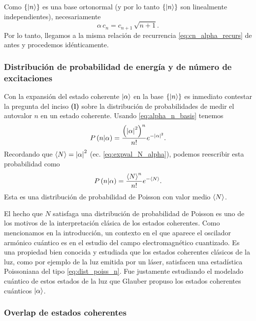 \documentclass[10pt, a4paper]{article}
\numberwithin{equation}{subsection}
\begin{document}
Como $\set{\ket{n}}$ es una base ortonormal (y por lo tanto $\set{\ket{n}}$ son
linealmente independientes), necesariamente
\begin{equation}
  \alpha\,c_n = c_{n+1}\,\sqrt{n+1}.
\end{equation}
Por lo tanto, llegamos a la misma relación de recurrencia
\eqref{eq:cn_alpha_recurs} de antes y procedemos idénticamente.

\subsubsection{Distribución de probabilidad de energía y de número de
  excitaciones}

Con la expansión del estado coherente $\ket{\alpha}$ en la base $\set{\ket{n}}$
es inmediato contestar la pregunta del inciso \textbf{(l)} sobre la
distribución de probabilidades de medir el autovalor $n$ en un estado coherente.
Usando \eqref{eq:alpha_n_basis} tenemos
\begin{equation}
  P\left({n}\middle|{\alpha}\right) = \frac{\left(\abs{\alpha}^2\right)^n}{n!}
    e^{-\abs{\alpha}^2}.
\end{equation}
Recordando que $\expval{N} = \abs{\alpha}^2$ (ec. \eqref{eq:expval_N_alpha}),
podemos reescribir esta probabilidad como
\begin{equation} \label{eq:dist_poiss_n}
  P\left({n}\middle|{\alpha}\right) = \frac{\expval{N}^n}{n!} e^{-\expval{N}}.
\end{equation}
Esta es una distribución de probabilidad de Poisson con valor medio
$\expval{N}$.

\bigbreak

El hecho que $N$ satisfaga una distribución de probabilidad de Poisson es uno
de los motivos de la interpretación clásica de los estados coherentes. Como
mencionamos en la introducción, un contexto en el que aparece el oscilador
armónico cuántico es en el estudio del campo electromagnético cuantizado. Es
una propiedad bien conocida y estudiada que los estados coherentes clásicos de
la luz, como por ejemplo de la luz emitida por un láser, satisfacen una
estadística Poissoniana del tipo \eqref{eq:dist_poiss_n}. Fue justamente
estudiando el modelado cuántico de estos estados de la luz que Glauber propuso
los estados coherentes cuánticos $\ket{\alpha}$.

\subsubsection{Overlap de estados coherentes}
\end{document}
